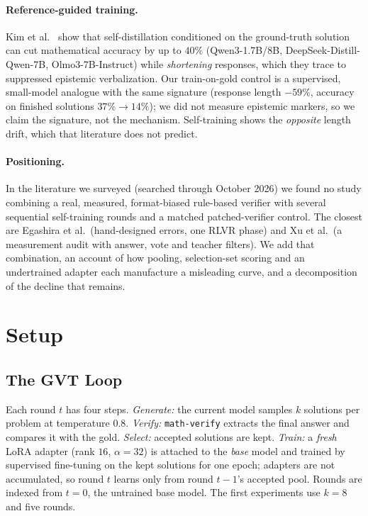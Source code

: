 \documentclass[runningheads]{llncs}
\begin{document}
\paragraph{Reference-guided training.}
Kim et al.~\cite{ref_selfdistill} show that self-distillation conditioned on the
ground-truth solution can cut mathematical accuracy by up to $40\%$ (Qwen3-1.7B/8B,
DeepSeek-Distill-Qwen-7B, Olmo3-7B-Instruct) while \emph{shortening} responses,
which they trace to suppressed epistemic verbalization. Our train-on-gold control
is a supervised, small-model analogue with the same signature (response length
$-59\%$, accuracy on finished solutions $37\%\to14\%$); we did not measure
epistemic markers, so we claim the signature, not the mechanism. Self-training
shows the \emph{opposite} length drift, which that literature does not predict.

\paragraph{Positioning.}
In the literature we surveyed (searched through October 2026) we found no study
combining a real, measured, format-biased rule-based verifier with several
sequential self-training rounds and a matched patched-verifier control. The
closest are Egashira et al.\ (hand-designed errors, one RLVR phase) and Xu et
al.\ (a measurement audit with answer, vote and teacher filters). We add that
combination, an account of how pooling, selection-set scoring and an undertrained
adapter each manufacture a misleading curve, and a decomposition of the decline
that remains.

\section{Setup}
\label{sec:setup}

\subsection{The GVT Loop}
\label{sec:loop}

Each round $t$ has four steps. \emph{Generate:} the current model samples $k$
solutions per problem at temperature $0.8$. \emph{Verify:} \texttt{math-verify}
extracts the final answer and compares it with the gold. \emph{Select:} accepted
solutions are kept. \emph{Train:} a \emph{fresh} LoRA adapter (rank $16$,
$\alpha=32$) is attached to the \emph{base} model and trained by supervised
fine-tuning on the kept solutions for one epoch; adapters are not accumulated, so
round $t$ learns only from round $t-1$'s accepted pool. Rounds are indexed from
$t=0$, the untrained base model. The first experiments use $k=8$ and five rounds.
\end{document}
